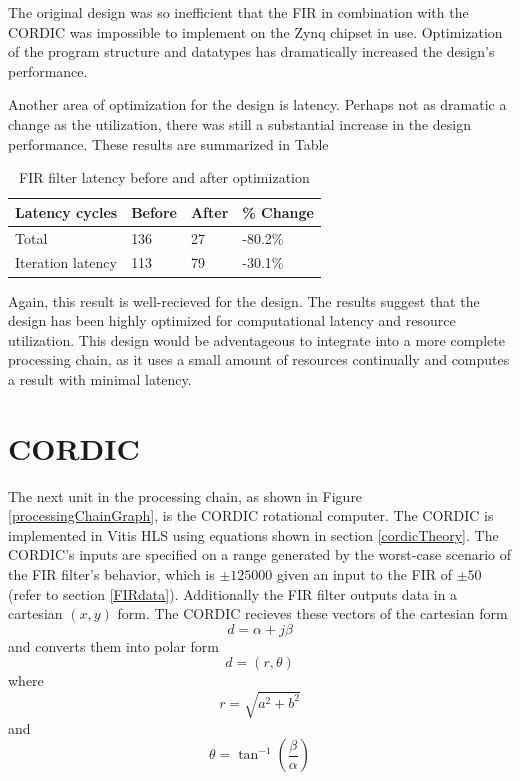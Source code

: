 \documentclass[11pt]{report}
\begin{document}
The original design was so inefficient that the FIR in combination with the CORDIC was impossible to implement on the Zynq chipset in use. Optimization of the program structure and datatypes has dramatically increased the design's performance.

Another area of optimization for the design is latency. Perhaps not as dramatic a change as the utilization, there was still a substantial increase in the design performance. These results are summarized in Table 
 
 \begin{table}[h!]
    \centering
    
    \begin{tabular}{|l|l|l|l|}
        \hline
		\textbf{Latency cycles} & \textbf{Before} & \textbf{After} & \textbf{\% Change} \\
		\hline \hline
		Total & 136 & 27 & -80.2\% \\
		\hline
		Iteration latency & 113 & 79 & -30.1\% \\
	\hline
		
    \end{tabular}
    \label{FIRresourceComparison}
    \caption{FIR filter latency before and after optimization}
\end{table}
\FloatBarrier

Again, this result is well-recieved for the design. The results suggest that the design has been highly optimized for computational latency and resource utilization. This design would be adventageous to integrate into a more complete processing chain, as it uses a small amount of resources continually and computes a result with minimal latency.

\chapter{CORDIC}

The next unit in the processing chain, as shown in Figure \ref{processingChainGraph}, is the CORDIC rotational computer. The CORDIC is implemented in Vitis HLS using equations shown in section \ref{cordicTheory}. The CORDIC's inputs are specified on a range generated by the worst-case scenario of the FIR filter's behavior, which is $\pm 125000$ given an input to the FIR of $\pm 50$ (refer to section \ref{FIRdata}). Additionally the FIR filter outputs data in a cartesian $(x, y)$ form. The CORDIC recieves these vectors of the cartesian form 
\begin{equation}
	d = \alpha + j\beta
\end{equation}
and converts them into polar form
\begin{equation}
	d = (r, \theta)
\end{equation}
where
\begin{equation}
	r = \sqrt{a^2 + b^2}
\end{equation}
and
\begin{equation}
	\theta = \tan^{-1}\left({\frac{\beta}{\alpha}}\right)
\end{equation}
\end{document}
